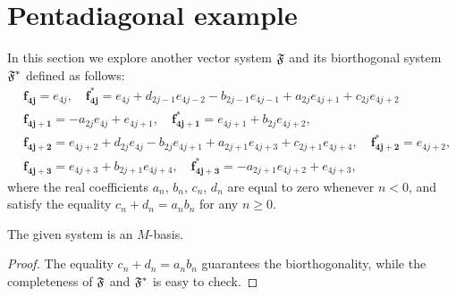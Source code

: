 \section{Pentadiagonal example}
  \label{section:pentadiagonal}
  In this section we explore another vector system $\mathfrak{F}$ and its biorthogonal system $\mathfrak{F^{*}}$ defined as follows:
  \begin{equation*}
    \label{eq:5system}
    \begin{aligned}
      &\mathbf{f_{4j}} = e_{4j}, \quad
      \mathbf{f^*_{4j}} = e_{4j} + d_{2j - 1} e_{4j-2} - b_{2j-1} e_{4j-1} + a_{2j} e_{4j+1} + c_{2j} e_{4j+2}\\
      &\mathbf{f_{4j+1}} = -a_{2j} e_{4j} + e_{4j+1}, \quad
      \mathbf{f^*_{4j+1}} = e_{4j+1} + b_{2j} e_{4j+2},\\
      &\mathbf{f_{4j+2}} = e_{4j+2} + d_{2j} e_{4j} - b_{2j} e_{4j+1} + a_{2j+1} e_{4j+3} + c_{2j+1} e_{4j+4},\quad
      \mathbf{f^*_{4j+2}} = e_{4j+2},\\
      &\mathbf{f_{4j+3}} = e_{4j+3} + b_{2j+1} e_{4j+4},\quad
      \mathbf{f^*_{4j+3}} = -a_{2j+1} e_{4j+2} + e_{4j+3},
    \end{aligned}
  \end{equation*}
    where the real coefficients $a_n$, $b_n$, $c_n$, $d_n$ are equal to zero whenever $n < 0$, and satisfy the equality
      $c_n + d_n = a_n b_n$ for any $n \geq 0$.
  \begin{prop}
    The given system is an $M$-basis.
  \end{prop}
  \begin{proof}
    The equality $c_n + d_n = a_n b_n$ guarantees the bi\-orthogonality,
      while the completeness of $\mathfrak{F}$ and $\mathfrak{F^{*}}$ is easy to check.
  \end{proof}

